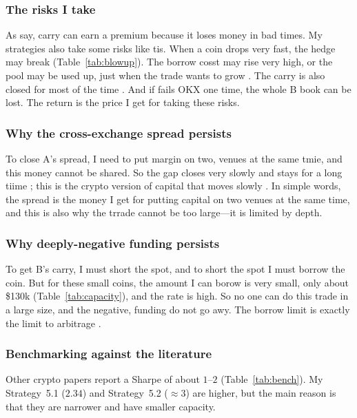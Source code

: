 \documentclass[10pt,twocolumn,a4paper]{article}
\begin{document}
\subsubsection{The risks I take}

As \cite{koijen2018carry} say, carry can earn a premium because it loses money in
bad times.  My strategies also take some risks like tis.  When a coin drops very
fast, the hedge may break (Table~\ref{tab:blowup}).  The borrow cosst may rise very
high, or the pool may be used up, just when the trade wants to grow
\cite{brunnermeier2009market, frazzini2014betting}.  The carry is also closed for
most of the time \cite{schmeling2023crypto}.  And if fails OKX one time, the whole B
book can be lost.  The return is the price I get for taking these risks.

\subsubsection{Why the cross-exchange spread persists}

To close A's spread, I need to put margin on two, venues at the same tmie, and this
money cannot be shared.  So the gap closes very slowly and stays for a long tiime
\cite{makarov2020trading}; this is the crypto version of capital that moves slowly
\cite{duffie2010presidential}.  In simple words, the spread is the money I get for
putting capital on two venues at the same time, and this is also why the trrade
cannot be too large---it is limited by depth.

\subsubsection{Why deeply-negative funding persists}

To get B's carry, I must short the spot, and to short the spot I must borrow the
coin.  But for these small coins, the amount I can borow is very small, only about
\$130k (Table~\ref{tab:capacity}), and the rate is high.  So no one can do this trade
in a large size, and the negative, funding do not go awy.  The borrow limit is
exactly the limit to arbitrage \cite{frazzini2014betting}.

\subsubsection{Benchmarking against the literature}

Other crypto papers report a Sharpe of about $1$--$2$
\cite{liu2022common, schmeling2023crypto} (Table~\ref{tab:bench}).  My Strategy~5.1
($2.34$) and Strategy~5.2 ($\approx 3$) are higher, but the main reason is that they
are narrower and have smaller capacity.
\end{document}
